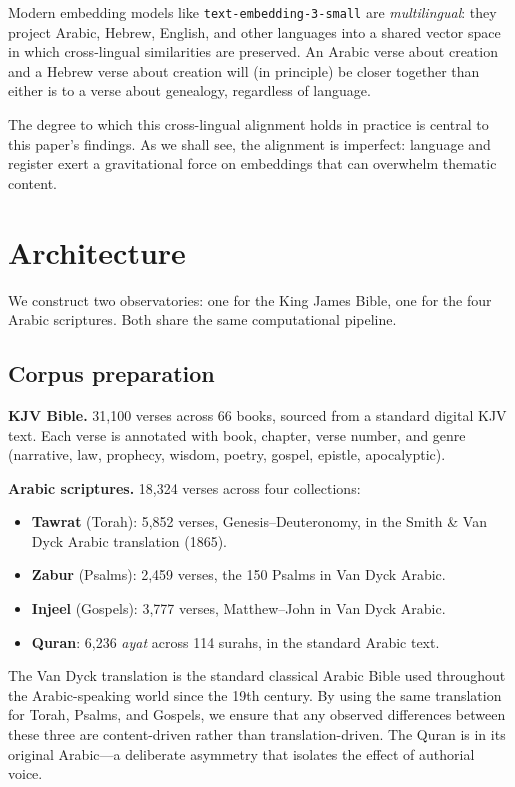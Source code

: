 \documentclass[11pt,a4paper]{article}
\theoremstyle{definition}
\begin{document}
Modern embedding models like \texttt{text-embedding-3-small} are \emph{multilingual}: they project Arabic, Hebrew, English, and other languages into a shared vector space in which cross-lingual similarities are preserved. An Arabic verse about creation and a Hebrew verse about creation will (in principle) be closer together than either is to a verse about genealogy, regardless of language.

The degree to which this cross-lingual alignment holds in practice is central to this paper's findings. As we shall see, the alignment is imperfect: language and register exert a gravitational force on embeddings that can overwhelm thematic content.


\section{Architecture}

We construct two observatories: one for the King James Bible, one for the four Arabic scriptures. Both share the same computational pipeline.

\subsection{Corpus preparation}

\textbf{KJV Bible.} 31,100 verses across 66 books, sourced from a standard digital KJV text. Each verse is annotated with book, chapter, verse number, and genre (narrative, law, prophecy, wisdom, poetry, gospel, epistle, apocalyptic).

\textbf{Arabic scriptures.} 18,324 verses across four collections:
\begin{itemize}[nosep]
  \item \textbf{Tawrat} (Torah): 5,852 verses, Genesis--Deuteronomy, in the Smith \& Van Dyck Arabic translation (1865).
  \item \textbf{Zabur} (Psalms): 2,459 verses, the 150 Psalms in Van Dyck Arabic.
  \item \textbf{Injeel} (Gospels): 3,777 verses, Matthew--John in Van Dyck Arabic.
  \item \textbf{Quran}: 6,236 \emph{ayat} across 114 surahs, in the standard Arabic text.
\end{itemize}

The Van Dyck translation is the standard classical Arabic Bible used throughout the Arabic-speaking world since the 19th century. By using the same translation for Torah, Psalms, and Gospels, we ensure that any observed differences between these three are content-driven rather than translation-driven. The Quran is in its original Arabic---a deliberate asymmetry that isolates the effect of authorial voice.
\end{document}
